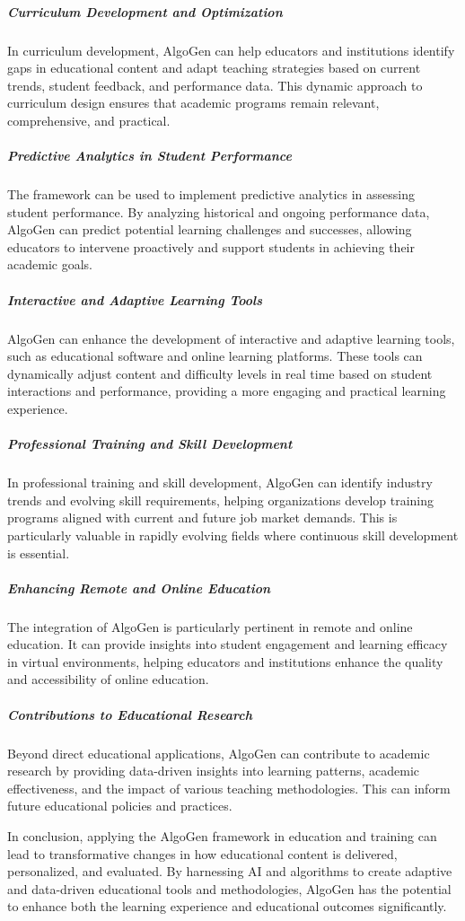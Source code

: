 \documentclass{article}
\begin{document}
\subparagraph{Curriculum Development and Optimization}
In curriculum development, AlgoGen can help educators and institutions identify gaps in educational content and adapt teaching strategies based on current trends, student feedback, and performance data. This dynamic approach to curriculum design ensures that academic programs remain relevant, comprehensive, and practical.

\subparagraph{Predictive Analytics in Student Performance}
The framework can be used to implement predictive analytics in assessing student performance. By analyzing historical and ongoing performance data, AlgoGen can predict potential learning challenges and successes, allowing educators to intervene proactively and support students in achieving their academic goals.

\subparagraph{Interactive and Adaptive Learning Tools}
AlgoGen can enhance the development of interactive and adaptive learning tools, such as educational software and online learning platforms. These tools can dynamically adjust content and difficulty levels in real time based on student interactions and performance, providing a more engaging and practical learning experience.

\subparagraph{Professional Training and Skill Development}
In professional training and skill development, AlgoGen can identify industry trends and evolving skill requirements, helping organizations develop training programs aligned with current and future job market demands. This is particularly valuable in rapidly evolving fields where continuous skill development is essential.

\subparagraph{Enhancing Remote and Online Education}
The integration of AlgoGen is particularly pertinent in remote and online education. It can provide insights into student engagement and learning efficacy in virtual environments, helping educators and institutions enhance the quality and accessibility of online education.

\subparagraph{Contributions to Educational Research}
Beyond direct educational applications, AlgoGen can contribute to academic research by providing data-driven insights into learning patterns, academic effectiveness, and the impact of various teaching methodologies. This can inform future educational policies and practices.

In conclusion, applying the AlgoGen framework in education and training can lead to transformative changes in how educational content is delivered, personalized, and evaluated. By harnessing AI and algorithms to create adaptive and data-driven educational tools and methodologies, AlgoGen has the potential to enhance both the learning experience and educational outcomes significantly.
\end{document}
